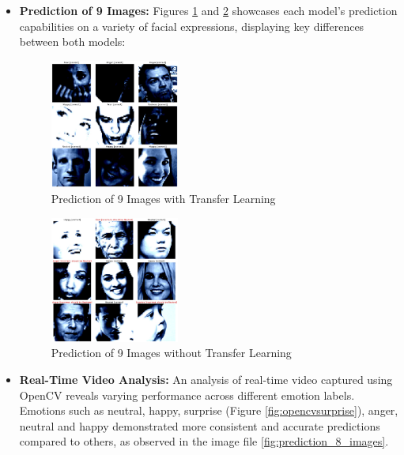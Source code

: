 \documentclass[conference]{IEEEtran}
\begin{document}
\begin{itemize}
    \item \textbf{Prediction of 9 Images:} Figures \ref{fig:9imageprediction_TLmodel} and \ref{fig:9imageprediction_NOTLmode} showcases each model's prediction capabilities on a variety of facial expressions, displaying key differences between both models:
    
    \begin{figure}[H]
        \centering
        \includegraphics[width=0.4\textwidth]{Figures/9imagepredictionTLmodel.png}
        \caption{Prediction of 9 Images with Transfer Learning}
        \label{fig:9imageprediction_TLmodel}
    \end{figure}

    \begin{figure}[H]
        \centering
        \includegraphics[width=0.4\textwidth]{Figures/9imagepredictionNOTLmodel.png}
        \caption{Prediction of 9 Images without Transfer Learning}
        \label{fig:9imageprediction_NOTLmode}
    \end{figure}
    
    \item \textbf{Real-Time Video Analysis:} An analysis of real-time video captured using OpenCV reveals varying performance across different emotion labels. Emotions such as neutral, happy, surprise (Figure \ref{fig:opencvsurprise}), anger, neutral and happy demonstrated more consistent and accurate predictions compared to others, as observed in the image file \ref{fig:prediction_8_images}.
    

\end{itemize}
\end{document}
